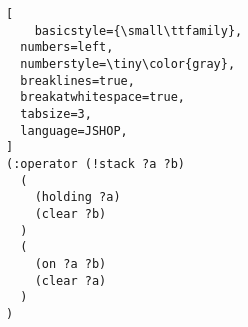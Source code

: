 \begin{lstlisting}[
    basicstyle={\small\ttfamily},
  numbers=left,
  numberstyle=\tiny\color{gray},
  breaklines=true,
  breakatwhitespace=true,
  tabsize=3,
  language=JSHOP,
]
(:operator (!stack ?a ?b)
  (
    (holding ?a)
    (clear ?b)
  )
  (
    (on ?a ?b)
    (clear ?a)
  )
)
\end{lstlisting}